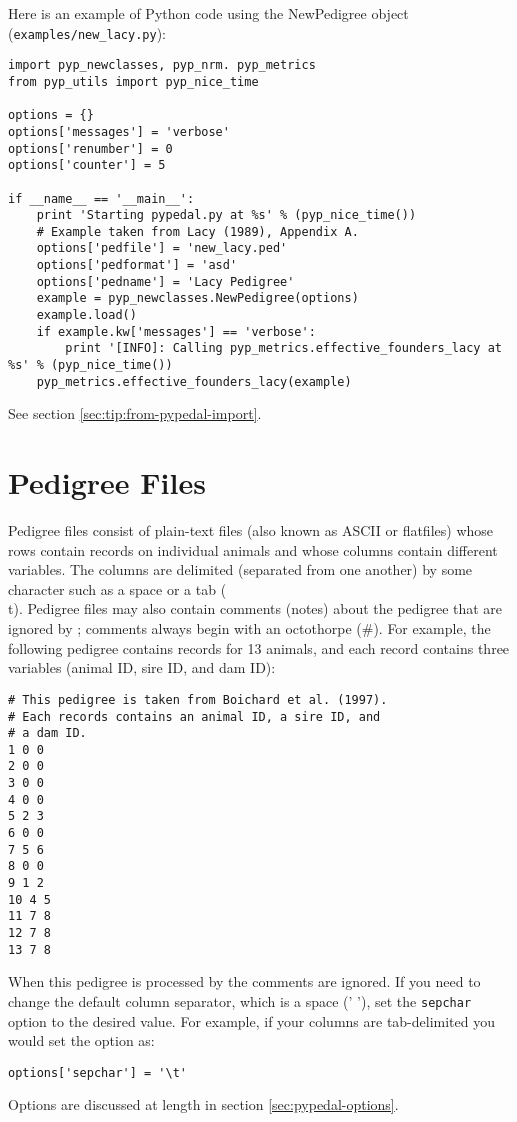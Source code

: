 Here is an example of Python code using the NewPedigree object (\texttt{examples/new_lacy.py}):
\begin{verbatim}
import pyp_newclasses, pyp_nrm. pyp_metrics
from pyp_utils import pyp_nice_time

options = {}
options['messages'] = 'verbose'
options['renumber'] = 0
options['counter'] = 5

if __name__ == '__main__':
    print 'Starting pypedal.py at %s' % (pyp_nice_time())
    # Example taken from Lacy (1989), Appendix A.
    options['pedfile'] = 'new_lacy.ped'
    options['pedformat'] = 'asd'
    options['pedname'] = 'Lacy Pedigree'
    example = pyp_newclasses.NewPedigree(options)
    example.load()
    if example.kw['messages'] == 'verbose':
        print '[INFO]: Calling pyp_metrics.effective_founders_lacy at %s' % (pyp_nice_time())
    pyp_metrics.effective_founders_lacy(example)
\end{verbatim}
See section \ref{sec:tip:from-pypedal-import}.

\section{Pedigree Files}
\label{sec:pedigree-files}
Pedigree files consist of plain-text files (also known as ASCII or flatfiles) whose rows contain
records on individual animals and whose columns contain different variables.  The columns are
delimited (separated from one another) by some character such as a space or a tab (\\t).  Pedigree
files may also contain comments (notes) about the pedigree that are ignored by \PyPedal{}; comments
always begin with an octothorpe (\#).  For example, the following pedigree contains records for 13
animals, and each record contains three variables (animal ID, sire ID, and dam ID):
\begin{verbatim}
# This pedigree is taken from Boichard et al. (1997).
# Each records contains an animal ID, a sire ID, and
# a dam ID.
1 0 0
2 0 0
3 0 0
4 0 0
5 2 3
6 0 0
7 5 6
8 0 0
9 1 2
10 4 5
11 7 8
12 7 8
13 7 8
\end{verbatim}
When this pedigree is processed by \PyPedal{} the comments are ignored.  If you need to change the
default column separator, which is a space (' '), set the \texttt{sepchar} option to the desired
value.  For example, if your columns are tab-delimited you would set the option as:
\begin{verbatim}
options['sepchar'] = '\t'
\end{verbatim}
Options are discussed at length in section \ref{sec:pypedal-options}.


